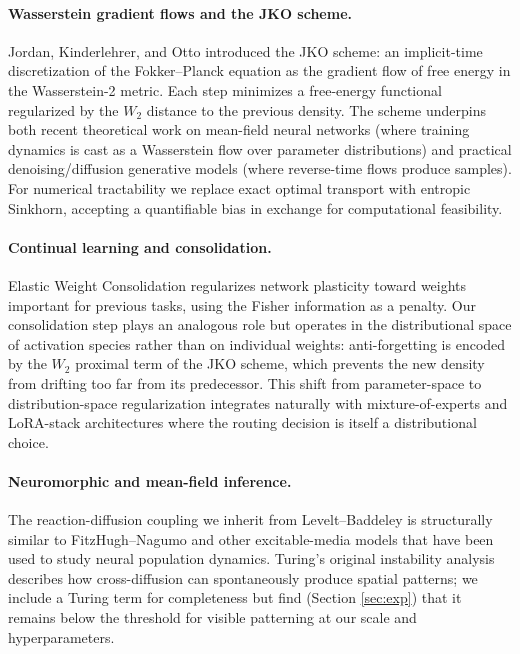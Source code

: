 \documentclass[11pt]{article}
\begin{document}
\paragraph{Wasserstein gradient flows and the JKO scheme.}
Jordan, Kinderlehrer, and Otto \cite{jko1998} introduced the JKO scheme:
an implicit-time discretization of the Fokker--Planck equation as the
gradient flow of free energy in the Wasserstein-2 metric. Each step
minimizes a free-energy functional regularized by the $W_2$ distance to
the previous density. The scheme underpins both recent theoretical work
on mean-field neural networks \cite{meimontanari2018} (where training
dynamics is cast as a Wasserstein flow over parameter distributions) and
practical denoising/diffusion generative models (where reverse-time
flows produce samples). For numerical tractability we replace exact
optimal transport with entropic Sinkhorn, accepting a quantifiable bias
\cite{feydy2019interpolating} in exchange for computational feasibility.

\paragraph{Continual learning and consolidation.}
Elastic Weight Consolidation \cite{kirkpatrick2017ewc} regularizes
network plasticity toward weights important for previous tasks, using
the Fisher information as a penalty. Our consolidation step plays an
analogous role but operates in the distributional space of activation
species rather than on individual weights: anti-forgetting is encoded by
the $W_2$ proximal term of the JKO scheme, which prevents the new
density from drifting too far from its predecessor. This shift from
parameter-space to distribution-space regularization integrates naturally
with mixture-of-experts and LoRA-stack architectures where the routing
decision is itself a distributional choice.

\paragraph{Neuromorphic and mean-field inference.}
The reaction-diffusion coupling we inherit from Levelt--Baddeley is
structurally similar to FitzHugh--Nagumo and other excitable-media
models that have been used to study neural population dynamics. Turing's
original instability analysis describes how cross-diffusion can
spontaneously produce spatial patterns; we include a Turing term for
completeness but find (Section \ref{sec:exp}) that it remains below the
threshold for visible patterning at our scale and hyperparameters.
\end{document}
